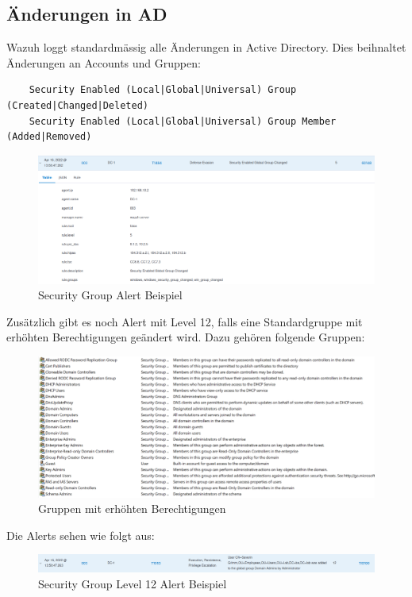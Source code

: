 \subsection{Änderungen in AD}
Wazuh loggt standardmässig alle Änderungen in Active Directory.
Dies beihnaltet Änderungen an Accounts und Gruppen:
\begin{lstlisting}
    Security Enabled (Local|Global|Universal) Group (Created|Changed|Deleted)
    Security Enabled (Local|Global|Universal) Group Member (Added|Removed)
\end{lstlisting}
\begin{figure}[H]
    \centering
    \includegraphics[width=\linewidth]{../img/IAM/security-group-alert-example.png}
    \caption{Security Group Alert Beispiel}
\end{figure}

Zusätzlich gibt es noch Alert mit Level 12, falls eine Standardgruppe mit erhöhten Berechtigungen geändert wird.
Dazu gehören folgende Gruppen:
\begin{figure}[H]
    \centering
    \includegraphics[width=\linewidth]{../img/IAM/high-privilege-groups.png}
    \caption{Gruppen mit erhöhten Berechtigungen}
\end{figure}
Die Alerts sehen wie folgt aus:
\begin{figure}[H]
    \centering
    \includegraphics[width=\linewidth]{../img/IAM/alert-added-to-privilege-group.png}
    \caption{Security Group Level 12 Alert Beispiel}
\end{figure}
